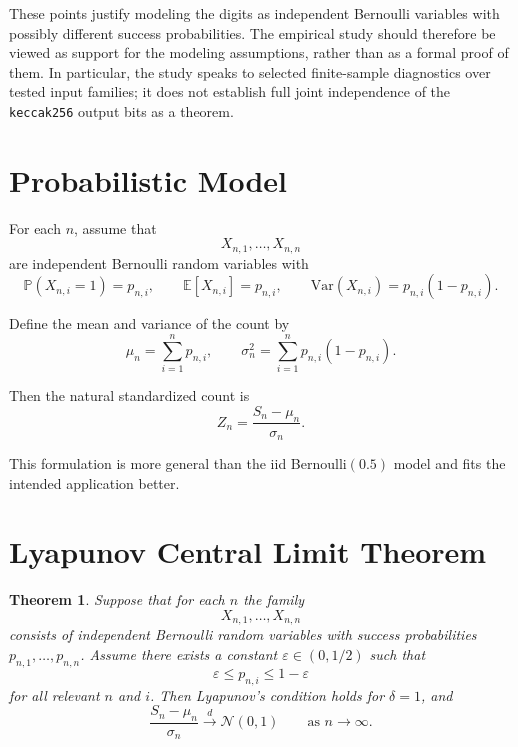 \documentclass[11pt]{article}
\newtheorem{theorem}{Theorem}
\begin{document}
These points justify modeling the digits as independent Bernoulli variables with
possibly different success probabilities. The empirical study should therefore
be viewed as support for the modeling assumptions, rather than as a formal proof
of them. In particular, the study speaks to selected finite-sample diagnostics
over tested input families; it does not establish full joint independence of the
\texttt{keccak256} output bits as a theorem.

\section{Probabilistic Model}

For each $n$, assume that
\[
X_{n,1}, \dots, X_{n,n}
\]
are independent Bernoulli random variables with
\[
\mathbb{P}(X_{n,i}=1)=p_{n,i}, \qquad
\mathbb{E}[X_{n,i}] = p_{n,i}, \qquad
\mathrm{Var}(X_{n,i}) = p_{n,i}(1-p_{n,i}).
\]

Define the mean and variance of the count by
\[
\mu_n = \sum_{i=1}^n p_{n,i},
\qquad
\sigma_n^2 = \sum_{i=1}^n p_{n,i}(1-p_{n,i}).
\]

Then the natural standardized count is
\[
Z_n = \frac{S_n - \mu_n}{\sigma_n}.
\]

This formulation is more general than the iid Bernoulli$(0.5)$ model and fits
the intended application better.

\section{Lyapunov Central Limit Theorem}

\begin{theorem}
Suppose that for each $n$ the family
\[
X_{n,1}, \dots, X_{n,n}
\]
consists of independent Bernoulli random variables with success probabilities
$p_{n,1}, \dots, p_{n,n}$. Assume there exists a constant
$\varepsilon \in (0, 1/2)$ such that
\[
\varepsilon \le p_{n,i} \le 1-\varepsilon
\]
for all relevant $n$ and $i$. Then Lyapunov's condition holds for $\delta = 1$,
and
\[
\frac{S_n - \mu_n}{\sigma_n}
\xrightarrow{d}
\mathcal{N}(0,1)
\qquad \text{as } n \to \infty.
\]
\end{theorem}
\end{document}
